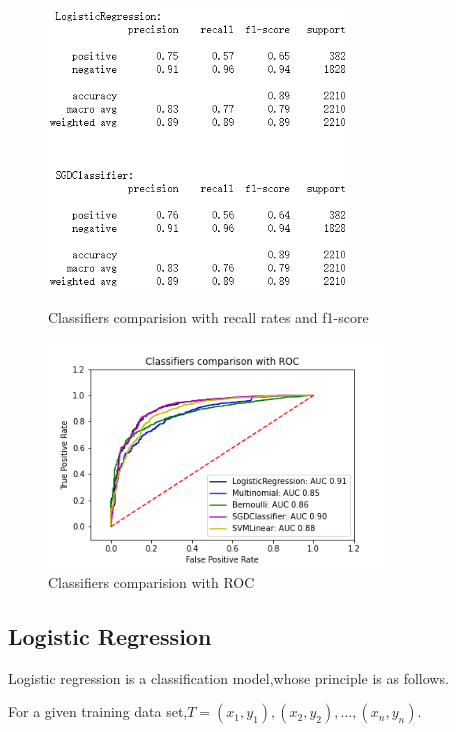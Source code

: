 \documentclass{mcmthesis}
\begin{document}
\begin{enumerate}[*]
\begin{figure}[htbp]
\centering
\begin{minipage}[t]{0.48\textwidth}
\centering
\includegraphics[width=8cm]{./figures/f1.png}
\caption{Classifiers comparision with recall rates and f1-score}
\label{fig:anna1}
\end{minipage}
\begin{minipage}[t]{0.48\textwidth}
\centering
\includegraphics[width=9cm]{./figures/f2.png}
\caption{Classifiers comparision with ROC}
\label{fig:anna2}
\end{minipage}
\end{figure}
\end{enumerate}






\subsection{Logistic Regression}

Logistic regression is a classification model,whose principle is as follows.

For a given training data set,$T = {(x_1, y_1),(x_2, y_2), ...,(x_n, y_n)}$.
\end{document}
